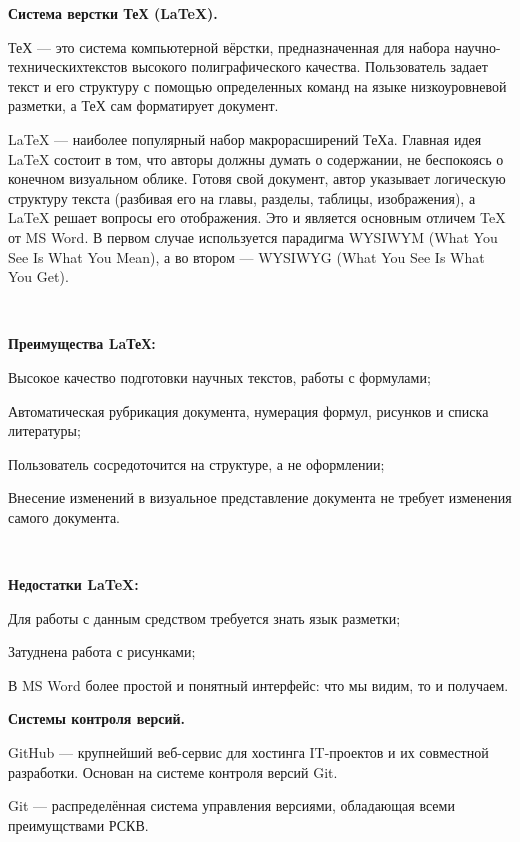 \documentclass{article}
\begin{document}
\textbf{\large Система верстки ТеХ (LaTeX).}

ТеХ — это система компьютерной вёрстки, предназначенная для набора научно-техническихтекстов высокого полиграфического качества.
Пользователь задает текст и его структуру с помощью определенных команд на языке низкоуровневой разметки, а ТеХ сам форматирует документ.

LaTeX — наиболее популярный набор макрорасширений ТеХа.
Главная идея LaTeX состоит в том, что авторы должны думать о содержании, не беспокоясь о конечном визуальном облике. Готовя свой документ, автор указывает логическую структуру текста (разбивая его на главы, разделы, таблицы, изображения), а LaTeX решает вопросы его отображения. 
Это и является основным отличем TeX от MS Word.
В первом случае используется парадигма WYSIWYM (What You See Is What You Mean), а во втором  — WYSIWYG (What You See Is What You Get).

~\

\textbf{Преимущества LaТеХ:}
\begin{compactitem}
\item Высокое качество подготовки научных текстов, работы с формулами;
\item Автоматическая рубрикация документа, нумерация формул, рисунков и списка литературы;
\item Пользователь сосредоточится на структуре, а не оформлении;
\item Внесение изменений в визуальное представление документа не требует изменения самого документа.
\end{compactitem}

~\

\textbf{Недостатки LaTeX:}
\begin{compactitem}
\item Для работы с данным средством требуется знать язык разметки;
\item Затуднена работа с рисунками;
\item В MS Word более простой и понятный интерфейс: что мы видим, то и получаем.
\end{compactitem}

\newpage

\textbf{\large Системы контроля версий.}

GitHub — крупнейший веб-сервис для хостинга IT-проектов и их совместной разработки. Основан на системе контроля версий Git.

Git — распределённая система управления версиями, обладающая всеми преимущствами РСКВ.
\end{document}
